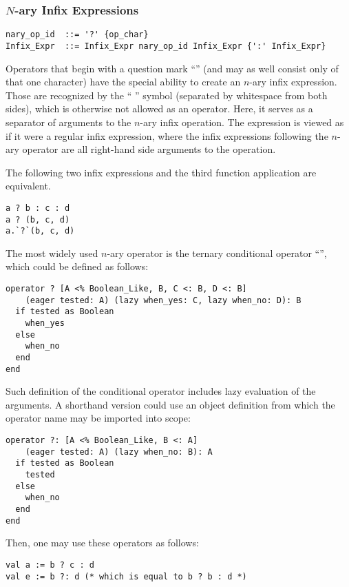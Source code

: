 \subsubsection{$N$-ary Infix Expressions}
\label{sec:nary-infix-expressions}

\syntax\begin{lstlisting}
nary_op_id  ::= '?' {op_char}
Infix_Expr  ::= Infix_Expr nary_op_id Infix_Expr {':' Infix_Expr}
\end{lstlisting}

Operators that begin with a question mark ``'' (and may as well consist only of that one character) have the special ability to create an $n$-ary infix expression. Those are recognized by the ``\,\code{:}\,'' symbol (separated by whitespace from both sides), which is otherwise not allowed as an operator. Here, it serves as a separator of arguments to the $n$-ary infix operation. The expression is viewed as if it were a regular infix expression, where the infix expressions following the $n$-ary operator are all right-hand side arguments to the operation. 

The following two infix expressions and the third function application are equivalent.
\begin{lstlisting}
a ? b : c : d
a ? (b, c, d)
a.`?`(b, c, d)
\end{lstlisting}

\example The most widely used $n$-ary operator is the ternary conditional operator ``'', which could be defined as follows:

\begin{lstlisting}
operator ? [A <% Boolean_Like, B, C <: B, D <: B]
    (eager tested: A) (lazy when_yes: C, lazy when_no: D): B
  if tested as Boolean
    when_yes
  else
    when_no
  end
end
\end{lstlisting}

Such definition of the conditional operator includes lazy evaluation of the arguments. A shorthand version could use an object definition from which the operator name may be imported into scope:

\begin{lstlisting}
operator ?: [A <% Boolean_Like, B <: A]
    (eager tested: A) (lazy when_no: B): A
  if tested as Boolean
    tested
  else
    when_no
  end
end
\end{lstlisting}

Then, one may use these operators as follows: 

\begin{lstlisting}
val a := b ? c : d
val e := b ?: d (* which is equal to b ? b : d *)
\end{lstlisting}





